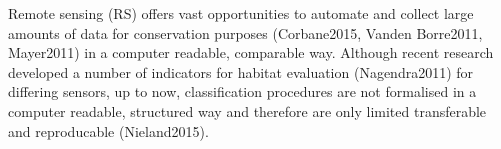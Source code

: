 \documentclass[authoryear, review,12pt,number]{elsarticle}
\begin{document}
Remote sensing (RS) offers vast opportunities to automate and collect large
amounts of data for conservation purposes (Corbane2015, Vanden Borre2011,
Mayer2011) in a computer readable, comparable way. Although recent
research developed a number of indicators for habitat evaluation (Nagendra2011) for differing sensors, up to now,
classification procedures are not formalised in a computer readable, structured
way and therefore are only limited transferable and reproducable (Nieland2015).



\end{document}
